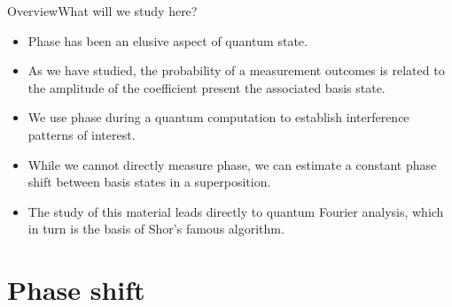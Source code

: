 
\begin{frame}{Overview}{What will we study here?}

\begin{itemize}[<+->]
    \item Phase has been an elusive aspect of quantum state.
    \item As we have studied, the probability of a measurement outcomes is related to the amplitude of the coefficient present the associated basis state.
    \item We use phase during a quantum computation to establish interference patterns of interest.
    \item While we cannot directly measure phase, we can estimate a constant phase shift between basis states in a superposition.
    \item The study of this material leads directly to quantum Fourier analysis, which in turn is the basis of Shor's famous algorithm.
\end{itemize}
    
\end{frame}

\section*{Phase shift}

